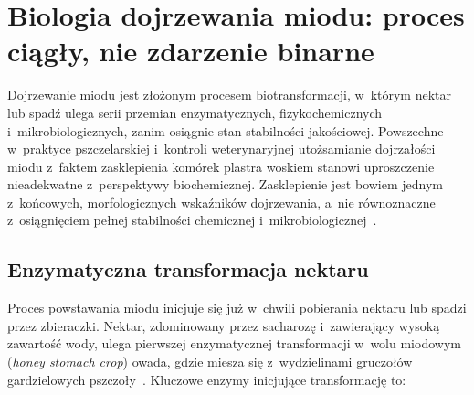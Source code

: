 
\section{Biologia dojrzewania miodu: proces ciągły, nie zdarzenie binarne}

Dojrzewanie miodu jest złożonym procesem biotransformacji, w~którym
nektar lub spadź ulega serii przemian enzymatycznych,
fizykochemicznych i~mikrobiologicznych, zanim osiągnie stan stabilności
jakościowej. Powszechne w~praktyce pszczelarskiej i~kontroli weterynaryjnej
utożsamianie dojrzałości miodu z~faktem zasklepienia komórek plastra woskiem stanowi uproszczenie nieadekwatne z~perspektywy biochemicznej. Zasklepienie jest bowiem jednym z~końcowych, morfologicznych
wskaźników dojrzewania, a~nie równoznaczne z~osiągnięciem pełnej
stabilności chemicznej i~mikrobiologicznej~\cite{zhang2021,sun2021}.

\subsection{Enzymatyczna transformacja nektaru}

Proces powstawania miodu inicjuje się już w~chwili pobierania nektaru lub spadzi
przez zbieraczki. Nektar, zdominowany przez sacharozę
i~zawierający wysoką zawartość wody, ulega pierwszej enzymatycznej
transformacji w~wolu miodowym (\textit{honey stomach crop}) owada,
gdzie miesza się z~wydzielinami gruczołów gardzielowych
pszczoły~\cite{biochemreactions2022}. Kluczowe enzymy inicjujące
transformację to:


